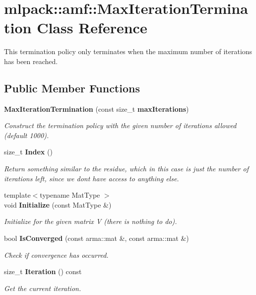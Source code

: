 \section{mlpack\+:\+:amf\+:\+:Max\+Iteration\+Termination Class Reference}
\label{classmlpack_1_1amf_1_1MaxIterationTermination}


This termination policy only terminates when the maximum number of iterations has been reached.  


\subsection*{Public Member Functions}
\begin{DoxyCompactItemize}
\item 
{\bf Max\+Iteration\+Termination} (const size\+\_\+t {\bf max\+Iterations})
\begin{DoxyCompactList}\small\item\em Construct the termination policy with the given number of iterations allowed (default 1000). \end{DoxyCompactList}\item 
size\+\_\+t {\bf Index} ()
\begin{DoxyCompactList}\small\item\em Return something similar to the residue, which in this case is just the number of iterations left, since we don\textquotesingle{}t have access to anything else. \end{DoxyCompactList}\item 
{\footnotesize template$<$typename Mat\+Type $>$ }\\void {\bf Initialize} (const Mat\+Type \&)
\begin{DoxyCompactList}\small\item\em Initialize for the given matrix V (there is nothing to do). \end{DoxyCompactList}\item 
bool {\bf Is\+Converged} (const arma\+::mat \&, const arma\+::mat \&)
\begin{DoxyCompactList}\small\item\em Check if convergence has occurred. \end{DoxyCompactList}\item 
size\+\_\+t {\bf Iteration} () const 
\begin{DoxyCompactList}\small\item\em Get the current iteration. \end{DoxyCompactList}\item 

\end{DoxyCompactItemize}
